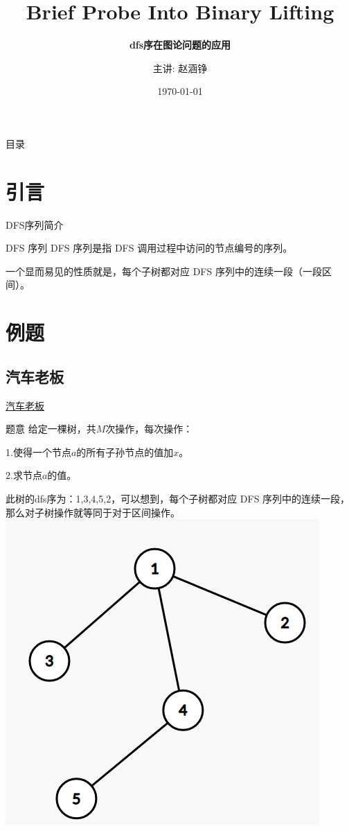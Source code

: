\documentclass[10pt,aspectratio=43,mathserif,table]{beamer}
\title{Brief Probe Into Binary Lifting}
\subtitle{\fontsize{9pt}{14pt}\textbf{dfs序在图论问题的应用}}
\author{主讲: 赵涵铮}
\institute{agile studio}
\date{\today}
\begin{document}
	
	\frame{\titlepage}
	
	\section[目录]{}   %
	\begin{frame}{目录}
		\tableofcontents
	\end{frame}
	
	\section{引言}  %
	\begin{frame}{DFS序列简介}
		\begin{block}{DFS 序列}
			DFS 序列是指 DFS 调用过程中访问的节点编号的序列。
			
			一个显而易见的性质就是，每个子树都对应 DFS 序列中的连续一段（一段区间）。
		\end{block}
	\end{frame}
	
	\section{例题}
	\subsection{汽车老板}
	\begin{frame}{\href{https://www.mfstem.org/p/1559}{汽车老板}}
		
		\begin{block}{题意}
			给定一棵树，共$M$次操作，每次操作：
			
			1.使得一个节点$a$的所有子孙节点的值加$x$。
			
			2.求节点$a$的值。
		\end{block}
	\end{frame}
	
	\begin{frame}
		此树的dfs序为：1,3,4,5,2，可以想到，每个子树都对应 DFS 序列中的连续一段，那么对子树操作就等同于对于区间操作。
		\includegraphics[width = 0.65\linewidth]{./figure/tree}		
	\end{frame}
	
\end{document}
